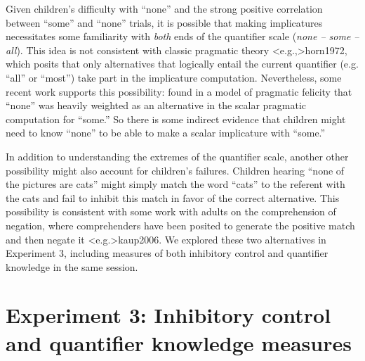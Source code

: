 \documentclass[man]{apa2}
\begin{document}
Given children's difficulty with ``none'' and the strong positive correlation between ``some'' and ``none'' trials, it is possible that making implicatures necessitates some familiarity with \emph{both} ends of the quantifier scale (\textit{none -- some -- all}). This idea is not consistent with classic pragmatic theory \citeA<e.g.,>{horn1972}, which posits that only alternatives that logically entail the current quantifier (e.g. ``all'' or ``most'') take part in the implicature computation. Nevertheless, some recent work supports this possibility:  found in a model of pragmatic felicity that ``none'' was heavily weighted as an alternative in the scalar pragmatic computation for ``some.'' So there is some indirect evidence that children might need to know ``none'' to be able to make a scalar implicature with ``some.''

In addition to understanding the extremes of the quantifier scale, another other possibility might also account for children's failures. Children hearing ``none of the pictures are cats'' might simply match the word ``cats'' to the referent with the cats and fail to inhibit this match in favor of the correct alternative. This possibility is consistent with some work with adults on the comprehension of negation, where comprehenders have been posited to generate the positive match and then negate it \citeA<e.g.>{kaup2006}. We explored these two alternatives in Experiment 3, including measures of both inhibitory control and quantifier knowledge in the same session.

\section{Experiment 3: Inhibitory control and quantifier knowledge measures}

\end{document}
